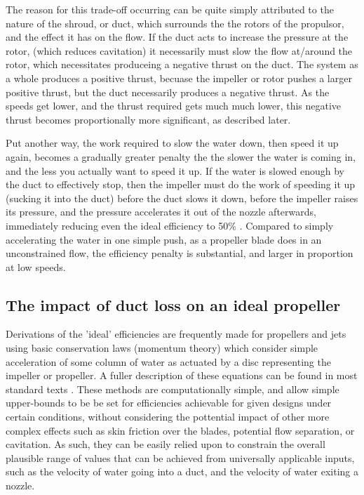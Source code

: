 \documentclass{article}\usepackage[]{graphicx}\usepackage[]{color}
\begin{document}
The reason for this trade-off occurring can be quite simply attributed to the nature of the shroud, or duct, which surrounds the the rotors of the propulsor, and the effect it has on the flow. If the duct acts to increase the pressure at the rotor, (which reduces cavitation) it necessarily must slow the flow at/around the rotor, which necessitates produceing a negative thrust on the duct.  The system as a whole produces a positive thrust, becuase the impeller or rotor pushes a larger positive thrust, but the duct necessarily produces a negative thrust.  As the speeds get lower, and the thrust required gets much much lower, this negative thrust becomes proportionally more significant, as described later.

Put another way, the work required to slow the water down, then speed it up again, becomes a gradually greater penalty the the slower the water is coming in, and the less you actually want to speed it up.  If the water is slowed enough by the duct to effectively stop, then the impeller must do the work of speeding it up (sucking it into the duct) before the duct slows it down, before the impeller raises its pressure, and the pressure accelerates it out of the nozzle afterwards, immediately reducing even the ideal efficiency to 50\% \parencite[277]{lewis1988}. Compared to simply accelerating the water in one simple push, as a propeller blade does in an unconstrained flow, the efficiency penalty is substantial, and larger in proportion at low speeds.

\subsection{The impact of duct loss on an ideal propeller}

Derivations of the 'ideal' efficiencies are frequently made for propellers and jets using basic conservation laws (momentum theory) which consider simple acceleration of some column of water as actuated by a disc representing the impeller or propeller.  A fuller description of these equations can be found in  most standard texts \parencite[131]{lewis1988}. These methods are computationally simple, and allow simple upper-bounds to be be set for efficiencies achievable for given designs under certain conditions, without considering the pottential impact of other more complex effects such as skin friction over the blades, potential flow separation, or cavitation.  As such, they can be easily relied upon to constrain the overall plausible range of values that can be achieved from universally applicable inputs, such as the velocity of water going into a duct, and the velocity of water exiting a nozzle.
\end{document}
